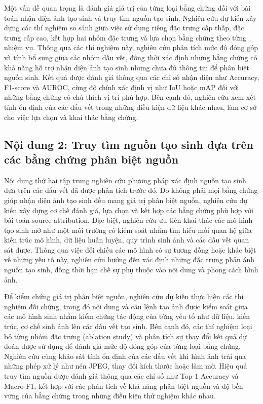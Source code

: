 \documentclass[12pt]{report}
\begin{document}
Một vấn đề quan trọng là đánh giá giá trị của từng loại bằng chứng đối với bài toán nhận diện ảnh tạo sinh và truy tìm nguồn tạo sinh. Nghiên cứu dự kiến xây dựng các thí nghiệm so sánh giữa việc sử dụng riêng đặc trưng cấp thấp, đặc trưng cấp cao, kết hợp hai nhóm đặc trưng và lựa chọn bằng chứng theo từng nhiệm vụ. Thông qua các thí nghiệm này, nghiên cứu phân tích mức độ đóng góp và tính bổ sung giữa các nhóm dấu vết, đồng thời xác định những bằng chứng có khả năng hỗ trợ nhận diện ảnh tạo sinh nhưng chưa đủ thông tin để phân biệt nguồn sinh. Kết quả được đánh giá thông qua các chỉ số nhận diện như Accuracy, F1-score và AUROC, cùng độ chính xác định vị như IoU hoặc mAP đối với những bằng chứng có chú thích vị trí phù hợp. Bên cạnh đó, nghiên cứu xem xét tính ổn định của các dấu vết trong những điều kiện dữ liệu khác nhau, làm cơ sở cho việc lựa chọn và khai thác bằng chứng.

\subsection{Nội dung 2: Truy tìm nguồn tạo sinh dựa trên các bằng chứng phân biệt nguồn}

Nội dung thứ hai tập trung nghiên cứu phương pháp xác định nguồn tạo sinh dựa trên các dấu vết đã được phân tích trước đó. Do không phải mọi bằng chứng giúp nhận diện ảnh tạo sinh đều mang giá trị phân biệt nguồn, nghiên cứu dự kiến xây dựng cơ chế đánh giá, lựa chọn và kết hợp các bằng chứng phù hợp với bài toán source attribution. Đặc biệt, nghiên cứu ưu tiên khai thác các mô hình tạo sinh mở như một môi trường có kiểm soát nhằm tìm hiểu mối quan hệ giữa kiến trúc mô hình, dữ liệu huấn luyện, quy trình sinh ảnh và các dấu vết quan sát được. Thông qua việc đối chiếu các mô hình có sự tương đồng hoặc khác biệt về những yếu tố này, nghiên cứu hướng đến xác định những đặc trưng phản ánh nguồn tạo sinh, đồng thời hạn chế sự phụ thuộc vào nội dung và phong cách hình ảnh.

Để kiểm chứng giá trị phân biệt nguồn, nghiên cứu dự kiến thực hiện các thí nghiệm đối chứng, trong đó nội dung và câu lệnh tạo ảnh được kiểm soát giữa các mô hình sinh nhằm kiểm chứng tác động của từng yếu tố như dữ liệu, kiến trúc, cơ chế sinh ảnh lên các dấu vết tạo sinh. Bên cạnh đó, các thí nghiệm loại bỏ từng nhóm đặc trưng (ablation study) và phân tích sự thay đổi kết quả dự đoán được sử dụng để đánh giá mức độ đóng góp của từng loại bằng chứng. Nghiên cứu cũng khảo sát tính ổn định của các dấu vết khi hình ảnh trải qua những phép xử lý như nén JPEG, thay đổi kích thước hoặc làm mờ. Hiệu quả truy tìm nguồn được đánh giá thông qua các chỉ số như Top-1 Accuracy và Macro-F1, kết hợp với các phân tích về khả năng phân biệt nguồn và độ bền vững của bằng chứng trong những điều kiện thử nghiệm khác nhau.
\end{document}
